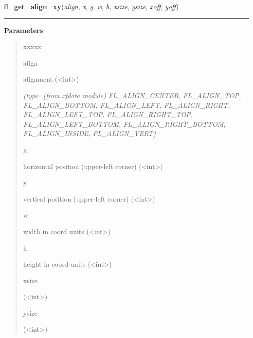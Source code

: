 \hspace{.8\funcindent}\begin{boxedminipage}{\funcwidth}

    \raggedright \textbf{fl\_get\_align\_xy}(\textit{align}, \textit{x}, \textit{y}, \textit{w}, \textit{h}, \textit{xsize}, \textit{ysize}, \textit{xoff}, \textit{yoff})

    \vspace{-1.5ex}

    \rule{\textwidth}{0.5\fboxrule}
\setlength{\parskip}{2ex}
\setlength{\parskip}{1ex}
      \textbf{Parameters}
      \vspace{-1ex}

      \begin{quote}
        \begin{Ventry}{xxxxx}

          \item[align]

          alignment ({\textless}int{\textgreater})

            {\it (type=(from xfdata module) FL\_ALIGN\_CENTER, FL\_ALIGN\_TOP, FL\_ALIGN\_BOTTOM, 
FL\_ALIGN\_LEFT, FL\_ALIGN\_RIGHT, FL\_ALIGN\_LEFT\_TOP, 
FL\_ALIGN\_RIGHT\_TOP, FL\_ALIGN\_LEFT\_BOTTOM, FL\_ALIGN\_RIGHT\_BOTTOM, 
FL\_ALIGN\_INSIDE, FL\_ALIGN\_VERT)}

          \item[x]

          horizontal position (upper-left corner) 
          ({\textless}int{\textgreater})

          \item[y]

          vertical position (upper-left corner) 
          ({\textless}int{\textgreater})

          \item[w]

          width in coord units ({\textless}int{\textgreater})

          \item[h]

          height in coord units ({\textless}int{\textgreater})

          \item[xsize]

          ({\textless}int{\textgreater})

          \item[ysize]

          ({\textless}int{\textgreater})


\end{Ventry}
\end{quote}
\end{boxedminipage}
